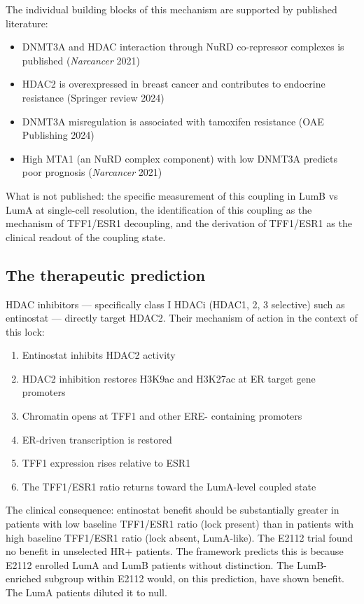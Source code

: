 \documentclass[12pt, a4paper]{article}
\begin{document}
The individual building blocks of this mechanism
are supported by published literature:

\begin{itemize}[noitemsep]
  \item DNMT3A and HDAC interaction through NuRD
        co-repressor complexes is published
        (\textit{Narcancer} 2021)
  \item HDAC2 is overexpressed in breast cancer
        and contributes to endocrine resistance
        (Springer review 2024)
  \item DNMT3A misregulation is associated with
        tamoxifen resistance (OAE Publishing 2024)
  \item High MTA1 (an NuRD complex component) with
        low DNMT3A predicts poor prognosis
        (\textit{Narcancer} 2021)
\end{itemize}

\noindent
What is not published: the specific measurement of
this coupling in LumB vs LumA at single-cell
resolution, the identification of this coupling as
the mechanism of TFF1/ESR1 decoupling, and the
derivation of TFF1/ESR1 as the clinical readout of
the coupling state.

\subsection{The therapeutic prediction}

HDAC inhibitors --- specifically class I HDACi
(HDAC1, 2, 3 selective) such as entinostat ---
directly target HDAC2. Their mechanism of action
in the context of this lock:
\begin{enumerate}[noitemsep]
  \item Entinostat inhibits HDAC2 activity
  \item HDAC2 inhibition restores H3K9ac and H3K27ac
        at ER target gene promoters
  \item Chromatin opens at TFF1 and other ERE-
        containing promoters
  \item ER-driven transcription is restored
  \item TFF1 expression rises relative to ESR1
  \item The TFF1/ESR1 ratio returns toward the
        LumA-level coupled state
\end{enumerate}

\noindent
The clinical consequence: entinostat benefit
should be substantially greater in patients with
low baseline TFF1/ESR1 ratio (lock present) than
in patients with high baseline TFF1/ESR1 ratio
(lock absent, LumA-like). The E2112 trial found
no benefit in unselected HR$+$ patients. The
framework predicts this is because E2112 enrolled
LumA and LumB patients without distinction. The
LumB-enriched subgroup within E2112 would, on
this prediction, have shown benefit. The LumA
patients diluted it to null.
\end{document}
